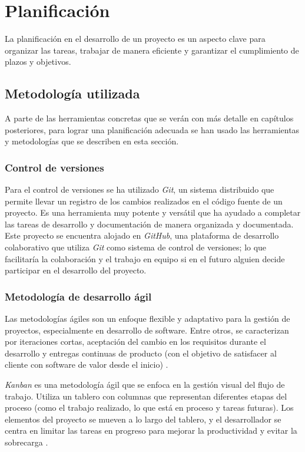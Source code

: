 \chapter{Planificación}

La planificación en el desarrollo de un proyecto es un aspecto clave para organizar las tareas, trabajar de manera eficiente y garantizar el cumplimiento de plazos y objetivos.

\section{Metodología utilizada}
A parte de las herramientas concretas que se verán con más detalle en capítulos posteriores, para lograr una planificación adecuada se han usado las herramientas y metodologías que se describen en esta sección.

\subsection{Control de versiones}
Para el control de versiones se ha utilizado \textit{Git}, un sistema distribuido que permite llevar un registro de los cambios realizados en el código fuente de un proyecto. Es una herramienta muy potente y versátil que ha ayudado a completar las tareas de desarrollo y documentación de manera organizada y documentada. Este proyecto se encuentra alojado en \textit{GitHub}, una plataforma de desarrollo colaborativo que utiliza \textit{Git} como sistema de control de versiones; lo que facilitaría la colaboración y el trabajo en equipo si en el futuro alguien decide participar en el desarrollo del proyecto.

\subsection{Metodología de desarrollo ágil}
Las metodologías ágiles son un enfoque flexible y adaptativo para la gestión de proyectos, especialmente en desarrollo de software. Entre otros, se caracterizan por iteraciones cortas, aceptación del cambio en los requisitos durante el desarrollo y entregas continuas de producto (con el objetivo de satisfacer al cliente con software de valor desde el inicio) \cite{agileprinciples}.

\textit{Kanban} es una metodología ágil que se enfoca en la gestión visual del flujo de trabajo. Utiliza un tablero con columnas que representan diferentes etapas del proceso (como el trabajo realizado, lo que está en proceso y tareas futuras). Los elementos del proyecto se mueven a lo largo del tablero, y el desarrollador se centra en limitar las tareas en progreso para mejorar la productividad y evitar la sobrecarga \cite{majkamastering}.

